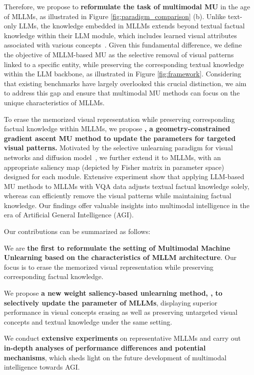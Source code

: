 Therefore, we propose to \textbf{reformulate the task of multimodal MU} in the age of MLLMs, as illustrated in Figure \ref{fig:paradigm_comparison} (b). Unlike text-only LLMs, the knowledge embedded in MLLMs extends beyond textual factual knowledge within their LLM module, which includes learned visual attributes associated with various concepts~\cite{cohen2024performance,yu2024understanding}. Given this fundamental difference, we define the objective of MLLM-based MU as the selective removal of visual patterns linked to a specific entity, while preserving the corresponding textual knowledge within the LLM backbone, as illustrated in Figure \ref{fig:framework}. Considering that existing benchmarks have largely overlooked this crucial distinction, we aim to address this gap and ensure that multimodal MU methods can focus on the unique characteristics of MLLMs. 

To erase the memorized visual representation while preserving corresponding factual knowledge within MLLMs, we propose \textbf{\method, a geometry-constrained gradient ascent MU method to update the parameters for targeted visual patterns.} Motivated by the selective unlearning paradigm for visual networks and diffusion model~\cite{fan2023salun,huang2024remain}, we further extend it to MLLMs, with an appropriate saliency map (depicted by Fisher matrix in parameter space) designed for each module. Extensive experiment show that applying LLM-based MU methods to MLLMs with VQA data adjusts textual factual knowledge solely, whereas \method can efficiently remove the visual patterns while maintaining factual knowledge. Our findings offer valuable insights into multimodal intelligence in the era of Artificial General Intelligence (AGI).

Our contributions can be summarized as follows:

 We are \textbf{the first to reformulate the setting of Multimodal Machine Unlearning based on the characteristics of MLLM architecture}. Our focus is to erase the memorized visual representation while preserving corresponding factual knowledge.

 We propose \textbf{a new weight saliency-based unlearning method, \method, to selectively update the parameter of MLLMs}, displaying superior performance in visual concepts erasing as well as preserving untargeted visual concepts and textual knowledge under the same setting.

 We conduct \textbf{extensive experiments} on representative MLLMs and carry out \textbf{in-depth analyses of performance differences and potential mechanisms}, which sheds light on the future development of multimodal intelligence towards AGI.

